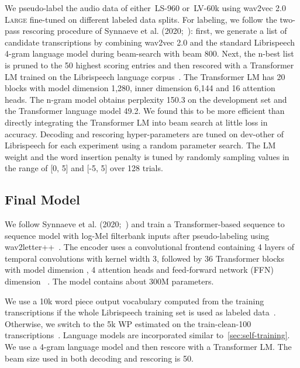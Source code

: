 \documentclass{article}
\newcommand{\wvpp}{wav2vec 2.0}
\newcommand{\wvppbig}{\textsc{Large}}
\newcommand{\libri}{Librispeech}
\newcommand{\voxsz}{LV-60k}
\newcommand{\librisz}{LS-960}
\begin{document}
We pseudo-label the audio data of either~\librisz{} or~\voxsz{} using \wvpp{} \wvppbig{} fine-tuned on different labeled data splits.
For labeling, we follow the two-pass rescoring procedure of Synnaeve et al. (2020;~\cite{synnaeve2019end}): 
first, we generate a list of candidate transcriptions by combining \wvpp{} and the standard Librispeech 4-gram language model during beam-search with beam 800.
Next, the n-best list is pruned to the 50 highest scoring entries and then rescored with a Transformer LM trained on the \libri{} language corpus~\cite{baevski2018adaptive,synnaeve2019end}.
The Transformer LM has 20 blocks with model dimension 1,280, inner dimension 6,144 and 16 attention heads. 
The n-gram model obtains perplexity 150.3 on the development set and the Transformer language model 49.2.
We found this to be more efficient than directly integrating the Transformer LM into beam search at little loss in accuracy.
Decoding and rescoring hyper-parameters are tuned on dev-other of \libri{} for each experiment using a random parameter search.
The LM weight and the word insertion penalty \cite{synnaeve2019end} is tuned by randomly sampling values in the range of [0, 5] and [-5, 5] over 128 trials.






\subsection{Final Model}
\label{sec:setup_finalmodel}

We follow Synnaeve et al. (2020;~\cite{synnaeve2019end}) and train a Transformer-based sequence to sequence model with log-Mel filterbank inputs after pseudo-labeling using wav2letter++~\cite{pratap2019w2l}.
The encoder uses a convolutional frontend containing 4 layers of temporal convolutions with kernel width 3, followed by 36 Transformer blocks with model dimension , 4 attention heads and feed-forward network (FFN) dimension ~\cite{vaswani2017transformer,synnaeve2019end}.
The model contains about 300M parameters.


We use a 10k word piece output vocabulary computed from the training transcriptions if the whole \libri{} training set is used as labeled data~\cite{kudo2018sentencepiece}. 
Otherwise, we switch to the 5k WP estimated on the train-clean-100 transcriptions~\cite{xu2020iterative,hsu2020semisupervised}.
Language models are incorporated similar to~\autoref{sec:self-training}. 
We use a 4-gram language model and then rescore with a Transformer LM. 
The beam size used in both decoding and rescoring is 50.
\end{document}
